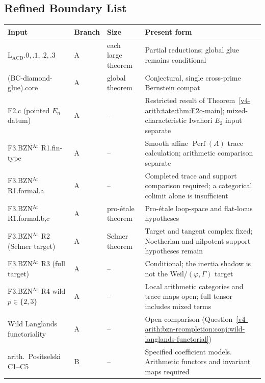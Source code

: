 \subsection{Refined Boundary List}
\label{v4-arith:app:C:residual-list-w2}

{\small
\begin{longtable}{@{}>{\raggedright\arraybackslash}p{}|>{\raggedright\arraybackslash}p{}|>{\raggedright\arraybackslash}p{}|>{\raggedright\arraybackslash}p{}@{}}
Input & Branch & Size & Present form \\
\hline
\endhead
\(\mathrm{L}_{\mathrm{ACD}}.0,.1,.2,.3\) & A & each large theorem & Partial reductions; global glue remains conditional \\
(BC-diamond-glue).core & A & global theorem & Conjectural, single cross-prime Bernstein compat \\
F2.c (pointed \(E_{n}\) datum) & A & -- & Restricted result of Theorem~\ref{v4-arith:tate:thm:F2c-main}; mixed-characteristic Iwahori \(E_2\) input separate \\
F3.BZN\(^{\mathrm{Ar}}\) R1.fin-type & A & -- & Smooth affine \(\operatorname{Perf}(A)\) trace calculation; arithmetic comparison separate \\
F3.BZN\(^{\mathrm{Ar}}\) R1.formal.a & A & -- & Completed trace and support comparison required; a categorical colimit alone is insufficient \\
F3.BZN\(^{\mathrm{Ar}}\) R1.formal.b,c & A & pro-\'etale theorem & Pro-\'etale loop-space and flat-locus hypotheses \\
F3.BZN\(^{\mathrm{Ar}}\) R2 (Selmer target) & A & Selmer theorem & Target and tangent complex fixed; Noetherian and nilpotent-support hypotheses remain \\
F3.BZN\(^{\mathrm{Ar}}\) R3 (full target) & A & -- & Conditional; the inertia shadow is not the Weil/\((\varphi,\Gamma)\) target \\
F3.BZN\(^{\mathrm{Ar}}\) R4 wild \(p\in\{2,3\}\) & A & -- & Local arithmetic categories and trace maps open; full tensor includes mixed terms \\
Wild Langlands functoriality & A & -- & Open comparison (Question~\ref{v4-arith:bzn-rcompletion:conj:wild-langlands-functorial}) \\
arith.~Positselski C1--C5 & B & -- & Specified coefficient models. Arithmetic functors and invariant maps required \\

\end{longtable}}
